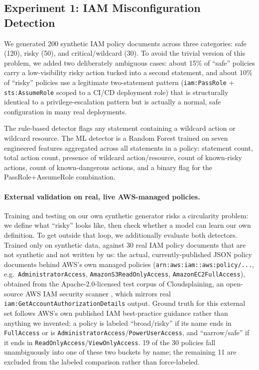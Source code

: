 \documentclass[11pt,a4paper]{article}
\begin{document}
\subsection{Experiment 1: IAM Misconfiguration Detection}

We generated 200 synthetic IAM policy documents across three categories: safe (120), risky (50), and critical/wildcard (30). To avoid the trivial version of this problem, we added two deliberately ambiguous cases: about 15\% of ``safe'' policies carry a low-visibility risky action tucked into a second statement, and about 10\% of ``risky'' policies use a legitimate two-statement pattern (\texttt{iam:PassRole} + \texttt{sts:AssumeRole} scoped to a CI/CD deployment role) that is structurally identical to a privilege-escalation pattern but is actually a normal, safe configuration in many real deployments.

The rule-based detector flags any statement containing a wildcard action or wildcard resource. The ML detector is a Random Forest trained on seven engineered features aggregated across all statements in a policy: statement count, total action count, presence of wildcard action/resource, count of known-risky actions, count of known-dangerous actions, and a binary flag for the PassRole+AssumeRole combination.

\paragraph{External validation on real, live AWS-managed policies.} Training and testing on our own synthetic generator risks a circularity problem: we define what ``risky'' looks like, then check whether a model can learn our own definition. To get outside that loop, we additionally evaluate both detectors. Trained only on synthetic data, against 30 real IAM policy documents that are not synthetic and not written by us: the actual, currently-published JSON policy documents behind AWS's own managed policies (\texttt{arn:aws:iam::aws:policy/...}, e.g.\ \texttt{AdministratorAccess}, \texttt{AmazonS3ReadOnlyAccess}, \texttt{AmazonEC2FullAccess}), obtained from the Apache-2.0-licensed test corpus of Cloudsplaining, an open-source AWS IAM security scanner \cite{cloudsplaining}, which mirrors real \texttt{iam:GetAccountAuthorizationDetails} output. Ground truth for this external set follows AWS's own published IAM best-practice guidance rather than anything we invented: a policy is labeled ``broad/risky'' if its name ends in \texttt{FullAccess} or is \texttt{AdministratorAccess}/\texttt{PowerUserAccess}, and ``narrow/safe'' if it ends in \texttt{ReadOnlyAccess}/\texttt{ViewOnlyAccess}. 19 of the 30 policies fall unambiguously into one of these two buckets by name; the remaining 11 are excluded from the labeled comparison rather than force-labeled.
\end{document}
